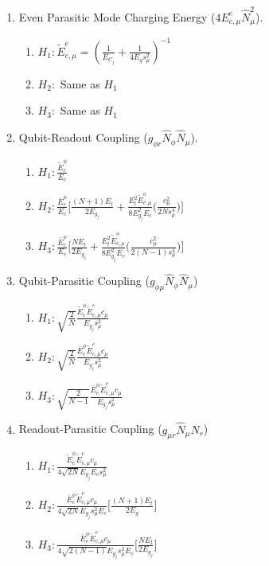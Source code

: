 \documentclass[%
reprint,
superscriptaddress,
 amsmath,amssymb,
 aps,
 prx,
longbibliography,
floatfix,
]{revtex4-2}
\begin{document}
\begin{enumerate}
\item Even Parasitic Mode Charging Energy  ($4E_{c,\mu}^e \hat N_{\mu}^2$). 
    \begin{enumerate}
    \item $H_1: \tilde{E}_{c,\mu}^{e}=(\frac{1}{E_{C_j}}+\frac{1}{4E_gs_\mu^2})^{-1}$ 
    \item $H_2:$ Same as $H_1$
    \item $H_3:$ Same as $H_1$
\end{enumerate}
     \item Qubit-Readout Coupling ($g_{\phi r}\hat N_\phi \hat N_\mu$).
    \begin{enumerate}
        \item $H_1: \frac{\tilde{E}_c^\phi}{E_c}$
        \item $H_2:\frac{\bar{E}_c^\phi}{E_c} \Big[\frac{(N+1)E_t}{2E_{g_j}}+\frac{E_t^2\tilde{E}_{c,\mu}^o}{8E_{g_j}^2E_c} \Big(\frac{c_\mu^2}{2Ns_\mu^4}\Big)\Big]$
        \item $H_3:\frac{\bar{E}_c^\phi}{E_c} \Big[\frac{NE_t}{2E_{g_j}}+\frac{E_t^2\tilde{E}_{c,\mu}^o}{8E_{g_j}^2E_c} \Big(\frac{c_\mu^2}{2(N-1)s_\mu^4}\Big)\Big]$
    \end{enumerate}
\item Qubit-Parasitic Coupling ($g_{\phi\mu}\hat N_\phi \hat N_\mu$)    
    \begin{enumerate}
        \item $H_1: \sqrt{\frac{2}{N}} \frac{\tilde{E}^\phi_c\tilde{E}^e_{c,\mu}c_\mu}{E_{g_j}s_\mu^2}$
        \item $H_2:\sqrt{\frac{2}{N}} \frac{\bar{E}^\phi_c\tilde{E}^{e}_{c,\mu}c_\mu}{E_{g_j}s_\mu^2}$
        \item $H_3:\sqrt{\frac{2}{N-1}} \frac{\bar{E}^\phi_c\tilde{E}^{e}_{c,\mu}c_\mu}{E_{g_j}s_\mu^2}$
    \end{enumerate}

\item Readout-Parasitic Coupling ($g_{\mu r}\hat N_\mu \hat N_r$)
    \begin{enumerate}
        \item $H_1: \frac{\tilde{E}^\phi_c\tilde{E}^e_{c,\mu}c_\mu}{4\sqrt{2N}E_{g_j}E_cs_\mu^2}$
        \item $H_2:\frac{\bar{E}^\phi_c\tilde{E}^{e}_{c,\mu}c_\mu }{4\sqrt{2N}E_{g_j}s_\mu^2E_c}\Big[\frac{(N+1)E_t}{2E_g} \Big]$
        \item $H_3:\frac{\bar{E}^\phi_c\tilde{E}^{e}_{c,\mu}c_\mu }{4\sqrt{2(N-1)}E_{g_j}s_\mu^2E_c}\Big[\frac{NE_t}{2E_{g_j}} \Big]$
    \end{enumerate}
   
\end{enumerate}
\end{document}

